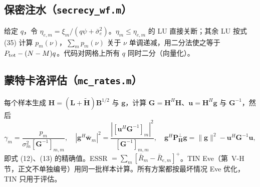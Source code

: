 \documentclass[11pt,a4paper]{ctexart}
\newcommand{\code}[1]{\texttt{#1}}
\newcommand{\Ptot}{P_{\rm tot}}
\begin{document}
\subsection{保密注水（\code{secrecy\_wf.m}）}
给定 $q$，令 $\eta_{e,m}=\xi_m/(q\psi+\bar\sigma_e^2)$。$\eta_m\le\eta_{e,m}$ 的 LU 直接关断；其余 LU 按式 (35) 计算 $p_m(\nu)$，$\sum_mp_m(\nu)$ 关于 $\nu$ 单调递减，用二分法使之等于 $\Ptot-(N-M)q$。代码对网格上所有 $q$ 同时二分（向量化）。

\subsection{蒙特卡洛评估（\code{mc\_rates.m}）}
每个样本生成 $\mathbf H=(\mathbf L+\tilde{\mathbf H})\mathbf B^{1/2}$ 与 $\mathbf g$，计算 $\mathbf G=\mathbf H^H\mathbf H$、$\mathbf u=\mathbf H^H\mathbf g$ 与 $\mathbf G^{-1}$，然后
\[
\gamma_m=\frac{p_m}{\sigma_m^2[\mathbf G^{-1}]_{m,m}},\quad
|\mathbf g^H\bar{\mathbf w}_m|^2=\frac{|[\mathbf u^H\mathbf G^{-1}]_m|^2}{[\mathbf G^{-1}]_{m,m}},\quad
\mathbf g^H\mathbf P_{\mathbf H}^\perp\mathbf g=\|\mathbf g\|^2-\mathbf u^H\mathbf G^{-1}\mathbf u,
\]
即式 (12)、(13) 的精确值。ESSR $=\sum_m[\bar R_m-\bar R_{e,m}]^+$。TIN Eve（第~V-H 节，正文不单独编号）用同一批样本计算。所有方案都按最坏情况 Eve 优化，TIN 只用于评估。

\end{document}
